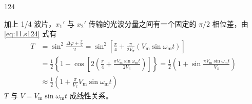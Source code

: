 \begin{solution}{124}
\begin{subsolution}
        加上 1/4 波片，$x_{1}'$ 与 $x_{2}'$ 传输的光波分量之间有一个固定的 $\pi/2$ 相位差，由 \eqref{eq:11.s124} 式有
        \begin{align}
            T & = \sin^{2} \frac{\Delta \varphi + \frac{\pi}{2}}{2} = \sin^{2} \left[ \frac{\pi}{4} + \frac{\pi}{2 V_{\pi}} (V_{\mathrm{m}} \sin \omega_{\mathrm{m}} t) \right] \nonumber \\
            & = \frac{1}{2} \left\{1 - \cos [2 (\frac{\pi}{4} + \frac{\pi V_{\mathrm{m}} \sin \omega_{\mathrm{m}} t}{2 V_{\pi}})] \right\} = \frac{1}{2} (1 + \sin \frac{\pi V_{\mathrm{m}} \sin \omega_{\mathrm{m}} t}{V_{\pi}}) \nonumber \\
            & \approx \frac{1}{2} (1 + \frac{\pi}{V_{\pi}} V_{\mathrm{m}} \sin \omega_{\mathrm{m}} t)
            \label{eq:12.s124}
        \end{align}
        $T$ 与 $V = V_{\mathrm{m}} \sin \omega_{\mathrm{m}} t$ 成线性关系。


\end{subsolution}
\end{solution}
